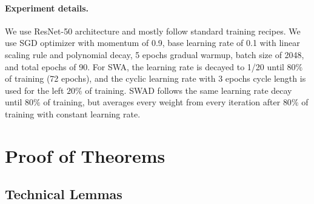 
\paragraph{Experiment details.}
We use ResNet-50 architecture and mostly follow standard training recipes. We use SGD optimizer with momentum of 0.9, base learning rate of 0.1 with linear scaling rule \cite{goyal2017training_imagenet_1hour} and polynomial decay, 5 epochs gradual warmup, batch size of 2048, and total epochs of 90. For SWA, the learning rate is decayed to 1/20 until $80\%$ of training (72 epochs), and the cyclic learning rate with 3 epochs cycle length is used for the left $20\%$ of training. SWAD follows the same learning rate decay until $80\%$ of training, but averages every weight from every iteration after $80\%$ of training with constant learning rate.


\section{Proof of Theorems}
\subsection{Technical Lemmas}

